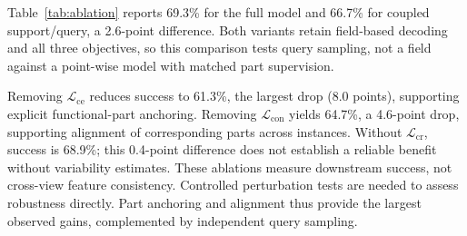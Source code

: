 Table~\ref{tab:ablation} reports 69.3\% for the full model and 66.7\% for coupled support/query, a 2.6-point difference. Both variants retain field-based decoding and all three objectives, so this comparison tests query sampling, not a field against a point-wise model with matched part supervision.

Removing $\mathcal{L}_{\mathrm{ce}}$ reduces success to 61.3\%, the largest drop (8.0 points), supporting explicit functional-part anchoring. Removing $\mathcal{L}_{\mathrm{con}}$ yields 64.7\%, a 4.6-point drop, supporting alignment of corresponding parts across instances. Without $\mathcal{L}_{\mathrm{cr}}$, success is 68.9\%; this 0.4-point difference does not establish a reliable benefit without variability estimates. These ablations measure downstream success, not cross-view feature consistency. Controlled perturbation tests are needed to assess robustness directly. Part anchoring and alignment thus provide the largest observed gains, complemented by independent query sampling.
